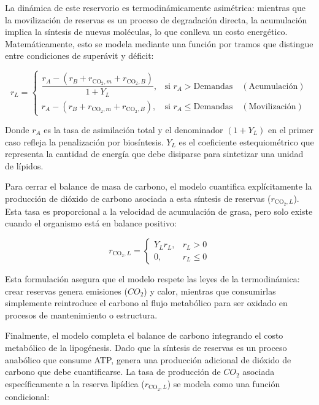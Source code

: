 La dinámica de este reservorio es termodinámicamente asimétrica: mientras que la movilización 
de reservas es un proceso de degradación directa, la acumulación implica la síntesis de nuevas 
moléculas, lo que conlleva un costo energético. Matemáticamente, esto se modela mediante una 
función por tramos que distingue entre condiciones de superávit y déficit:

\begin{equation}
r_L =
\begin{cases}
\dfrac{r_A - \left( r_B + r_{\mathrm{CO_2},m} + r_{\mathrm{CO_2},B} \right)}{1 + Y_L}, & \text{si } r_A > \text{Demandas} \quad (\text{Acumulación}) \\[15pt]
r_A - \left( r_B + r_{\mathrm{CO_2},m} + r_{\mathrm{CO_2},B} \right), & \text{si } r_A \leq \text{Demandas} \quad (\text{Movilización})
\end{cases}
\label{eq:rL}
\end{equation}

Donde $r_A$ es la tasa de asimilación total y el denominador $(1 + Y_L)$ en el primer caso 
refleja la penalización por biosíntesis. $Y_L$ es el coeficiente estequiométrico que representa 
la cantidad de energía que debe disiparse para sintetizar una unidad de lípidos.

Para cerrar el balance de masa de carbono, el modelo cuantifica explícitamente la producción 
de dióxido de carbono asociada a esta síntesis de reservas ($r_{\mathrm{CO_2},L}$). Esta tasa 
es proporcional a la velocidad de acumulación de grasa, pero solo existe cuando el organismo 
está en balance positivo:

\begin{equation}
r_{\mathrm{CO_2},L} = 
\begin{cases} 
Y_L r_L, & r_L > 0 \\
0, & r_L \leq 0 
\end{cases}
\end{equation}

Esta formulación asegura que el modelo respete las leyes de la termodinámica: crear reservas 
genera emisiones ($CO_2$) y calor, mientras que consumirlas simplemente reintroduce el carbono 
al flujo metabólico para ser oxidado en procesos de mantenimiento o estructura.

Finalmente, el modelo completa el balance de carbono integrando el costo metabólico de la 
lipogénesis. Dado que la síntesis de reservas es un proceso anabólico que consume ATP, 
genera una producción adicional de dióxido de carbono que debe cuantificarse. La tasa de 
producción de $CO_2$ asociada específicamente a la reserva lipídica ($r_{\mathrm{CO_2},L}$) 
se modela como una función condicional:

